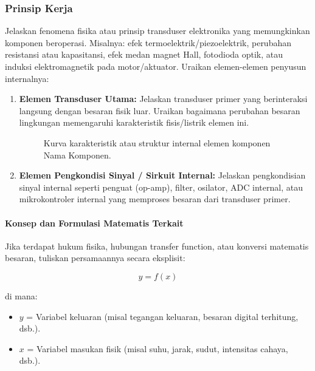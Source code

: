 \subsubsection{Prinsip Kerja}
Jelaskan fenomena fisika atau prinsip transduser elektronika yang memungkinkan komponen
beroperasi. Misalnya: efek termoelektrik/piezoelektrik, perubahan resistansi atau kapasitansi,
efek medan magnet Hall, fotodioda optik, atau induksi elektromagnetik pada motor/aktuator.
Uraikan elemen-elemen penyusun internalnya:

\begin{enumerate}
	\item \textbf{Elemen Transduser Utama:}
	      Jelaskan transduser primer yang berinteraksi langsung dengan besaran fisik luar.
	      Uraikan bagaimana perubahan besaran lingkungan memengaruhi karakteristik fisis/listrik elemen ini.

	      \begin{figure}[H]
		      \centering
		      \caption{Kurva karakteristik atau struktur internal elemen komponen Nama Komponen.}
		      \label{fig:nama_komponen_karakteristik}
	      \end{figure}

	\item \textbf{Elemen Pengkondisi Sinyal / Sirkuit Internal:}
	      Jelaskan pengkondisian sinyal internal seperti penguat (op-amp), filter, osilator,
	      ADC internal, atau mikrokontroler internal yang memproses besaran dari transduser primer.
\end{enumerate}

\paragraph{Konsep dan Formulasi Matematis Terkait}
Jika terdapat hukum fisika, hubungan transfer function, atau konversi matematis besaran,
tuliskan persamaannya secara eksplisit:

\begin{equation}
	y = f(x)
	\label{eq:nama_komponen_formulasi}
\end{equation}

\noindent di mana:
\begin{itemize}
	\item $y$ = Variabel keluaran (misal tegangan keluaran, besaran digital terhitung, dsb.).
	\item $x$ = Variabel masukan fisik (misal suhu, jarak, sudut, intensitas cahaya, dsb.).
\end{itemize}

